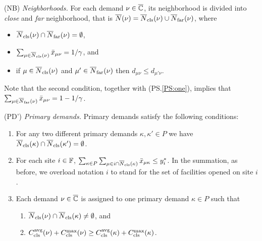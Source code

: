 \begin{description}
	
      \renewcommand{\theenumii}{(\alph{enumii})}
      \renewcommand{\labelenumii}{\theenumii}

\item{(NB)} \label{NB}
	\emph{Neighborhoods.}
	For each demand $\nu \in \overline{\mathbb{C}}$, its neighborhood is divided into \emph{close} and
	\emph{far} neighborhood, that is ${\overline{N}}(\nu) = {\overline{N}}_{\text{cls}}(\nu) \cup {\overline{N}}_{\text{far}}(\nu)$, where
	\begin{itemize}
	\item ${\overline{N}}_{\text{cls}}(\nu) \cap {\overline{N}}_{\text{far}}(\nu) = \emptyset$,
	\item $\sum_{\mu\in{\overline{N}}_{\text{cls}}(\nu)} {\bar x}_{\mu\nu} =1/\gamma$, and 
	\item if $\mu\in {\overline{N}}_{\text{cls}}(\nu)$ and $\mu'\in {\overline{N}}_{\text{far}}(\nu)$ 
				then $d_{\mu\nu}\le d_{\mu'\nu}$.   
	\end{itemize}
	Note that the second condition, together with (PS.\ref{PS:one}), implies
	that $\sum_{\mu\in{\overline{N}}_{\text{far}}(\nu)} {\bar x}_{\mu\nu} =1-1/\gamma$.

\item{(PD')} \emph{Primary demands.}
	Primary demands satisfy the following conditions:

	\begin{enumerate}
		
	\item\label{PD1:disjoint}  For any two different primary demands $\kappa,\kappa'\in P$ we have
				${\overline{N}}_{\text{cls}}(\kappa)\cap {\overline{N}}_{\text{cls}}(\kappa') = \emptyset$.

	\item \label{PD1:yi} For each site $i\in\mathbb{F}$, 
		$ \sum_{\kappa\in P}\sum_{\mu\in
                  i\cap{\overline{N}}_{\text{cls}}(\kappa)}{\bar x}_{\mu\kappa} \leq
                y_i^\ast$. In the summation, as before, we overload notation $i$ to stand for the set of
						facilities opened on site $i$.
		
	\item \label{PD1:assign} Each demand $\nu\in\overline{\mathbb{C}}$ is assigned
        to one primary demand $\kappa\in P$ such that

  			\begin{enumerate}
	
				\item \label{PD1:assign:overlap} ${\overline{N}}_{\text{cls}}(\nu) \cap {\overline{N}}_{\text{cls}}(\kappa) \neq \emptyset$, and
				\item \label{PD1:assign:cost}
          $C_{\text{cls}}^{{\mbox{\scriptsize\rm avg}}}(\nu)+C_{\text{cls}}^{\max}(\nu) \geq
          C_{\text{cls}}^{{\mbox{\scriptsize\rm avg}}}(\kappa)+C_{\text{cls}}^{\max}(\kappa)$.
			\end{enumerate}


\end{enumerate}
\end{description}
